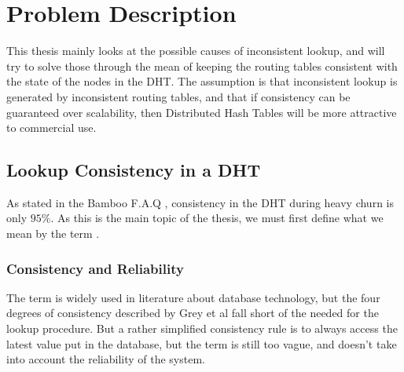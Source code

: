 \section{Problem Description}
\label{sec:ProblemDescription}

This thesis mainly looks at the possible causes of inconsistent lookup,
 and will try to solve those through the mean of keeping the routing tables
 consistent with the state of the nodes in the DHT. The assumption is that
 inconsistent lookup is generated by inconsistent routing tables, and that
 if consistency can be guaranteed over scalability, then Distributed Hash Tables
 will be more attractive to commercial use.

\subsection{Lookup Consistency in a DHT}
\label{problem:ReliableLookup}

As stated in the Bamboo F.A.Q \cite{bamboo-homepage}, consistency in the
 DHT during heavy churn is only $95\%$. As this is the main topic of the
 thesis, we must first define what we mean by the term .

\subsubsection{Consistency and Reliability}

The term  is widely used in literature about database
 technology, but the four degrees of consistency described by Grey et
  al\cite{grey-75-consistency-locks} %
 fall short of the  needed for the lookup
 procedure. But a rather simplified consistency rule is to always access the
 latest value put in the database, but the term is still too vague, and doesn't
 take into account the reliability of the system.

